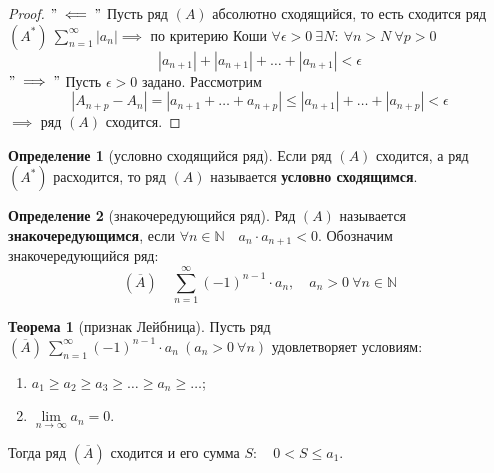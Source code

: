 \documentclass{report}
\theoremstyle{definition}
\newtheorem{definition}{Определение}[section]
\newtheorem{theorem}{Теорема}[section]
\begin{document}
\begin{proof}
  $"\impliedby"$ Пусть ряд $(A)$ абсолютно сходящийся, то есть сходится ряд $(A^*) \ \sum_{n=1}^{\infty}|a_n| \implies$ по критерию Коши $\forall \epsilon > 0 \ \exists N: \ \forall n > N \ \forall p > 0$
  \begin{equation*}
    |a_{n+1}| + |a_{n+1}| + \ldots + |a_{n+1}| < \epsilon
  \end{equation*}
  $"\implies"$ Пусть $\epsilon > 0$ задано. Рассмотрим
  \begin{equation*}
    |A_{n+p} - A_n| = |a_{n+1} + \ldots + a_{n+p}| \leqslant |a_{n+1}| + \ldots + |a_{n+p}| < \epsilon
  \end{equation*}
  $\implies$ ряд $(A)$ сходится.
\end{proof}

\begin{definition}[условно сходящийся ряд]
  Если ряд $(A)$ сходится, а ряд $(A^*)$ расходится, то ряд $(A)$ называется \textbf{условно сходящимся}.
\end{definition}

\begin{definition}[знакочередующийся ряд]
  Ряд $(A)$ называется \textbf{знакочередующимся}, если $\forall n \in \mathbb{N} \quad a_n \cdot a_{n+1} < 0$. Обозначим знакочередующийся ряд:
  \begin{equation*}
    (\overline{A}) \quad \sum_{n=1}^{\infty}(-1)^{n-1}\cdot a_n, \quad a_n > 0 \ \forall n \in\mathbb{N}
  \end{equation*}
\end{definition}

\begin{theorem}[признак Лейбница]
  Пусть ряд $(\overline{A}) \ \sum_{n=1}^{\infty}(-1)^{n-1}\cdot a_n \ (a_n > 0 \ \forall n)$ удовлетворяет условиям:
  \begin{enumerate}
    \item $a_1 \geqslant a_2 \geqslant a_3 \geqslant \ldots \geqslant a_n \geqslant \ldots$;
    \item $\underset{n\rightarrow\infty}{\lim} a_n = 0$.
  \end{enumerate}

  Тогда ряд $(\overline{A})$ сходится и его сумма $S: \quad 0 < S \leqslant a_1$.
\end{theorem}
\end{document}
